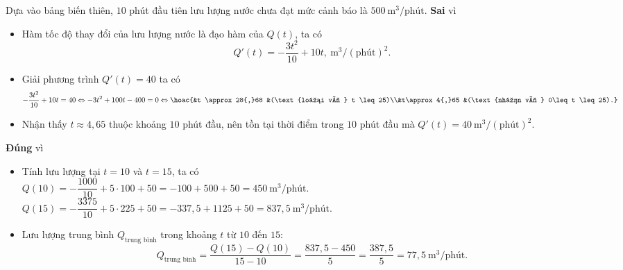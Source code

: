\begin{ex}
{\begin{itemchoice}
\begin{center}
	\end{center}
	Dựa vào bảng biến thiên, $10$ phút đầu tiên lưu lượng nước chưa đạt mức cảnh báo là $500 \mathrm{~m}^3 / \mathrm{phút}$.
	 \itemch \textbf{Sai} vì
	 \begin{itemize}
		\item Hàm tốc độ thay đổi của lưu lượng nước là đạo hàm của $Q(t)$, ta có
		$$
		Q'(t) = -\dfrac{3t^2}{10} + 10t, \mathrm{~m}^3/(\text{phút})^2.
		$$
		\item Giải phương trình $Q'(t) = 40$ ta có 
		$$
		-\dfrac{3t^2}{10} + 10t = 40 \Leftrightarrow
		-3t^2 + 100t - 400 = 0 \Leftrightarrow \hoac{&t \approx 28{,}68 &(\text{loại vì } t \leq 25)\\&t\approx 4{,}65 &(\text{nhận vì } 0\leq t \leq 25).}
		$$
		\item Nhận thấy $t \approx 4{,}65$ thuộc khoảng $10$ phút đầu, nên tồn tại thời điểm trong $10$ phút đầu mà $Q'(t) = 40 \mathrm{~m}^3/(\text{phút})^2$.
	\end{itemize}
	 \itemch \textbf{Đúng} vì
	 \begin{itemize}
		\item Tính lưu lượng tại $t = 10$ và $t = 15$, ta có\\
		$
		Q(10) = -\dfrac{1000}{10} + 5 \cdot 100 + 50 = -100 + 500 + 50 = 450 \mathrm{~m}^3/\text{phút}.
		$\\ 
		$
		Q(15) = -\dfrac{3375}{10} + 5 \cdot225 + 50 = -337{,}5 + 1125 + 50 = 837{,}5 \mathrm{~m}^3/\text{phút}.
		$
		\item Lưu lượng trung bình $Q_{\text{trung bình}}$ trong khoảng $t$ từ $10$ đến $15$:
		$$
		Q_{\text{trung bình}} = \dfrac{Q(15) - Q(10)}{15 - 10} = \dfrac{837{,}5 - 450}{5} = \dfrac{387{,}5}{5} = 77{,}5 \mathrm{~m}^3/\text{phút}.
		$$
	\end{itemize}
	 \end{itemchoice}
	}
\end{ex}

